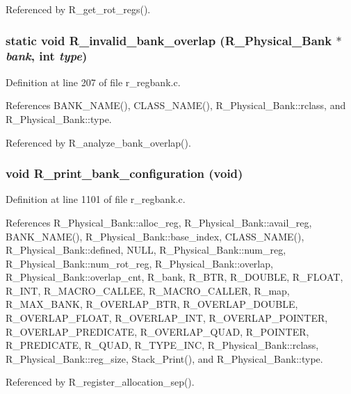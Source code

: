 Referenced by R\_\-get\_\-rot\_\-regs().
\subsubsection{\setlength{\rightskip}{0pt plus 5cm}static void R\_\-invalid\_\-bank\_\-overlap (\bf{R\_\-Physical\_\-Bank} $\ast$ {\em bank}, int {\em type})\hspace{0.3cm}{\tt  [static]}}\label{r__regbank_8c_d3d6af32f7146d72713411dff75451fa}




Definition at line 207 of file r\_\-regbank.c.

References BANK\_\-NAME(), CLASS\_\-NAME(), R\_\-Physical\_\-Bank::rclass, and R\_\-Physical\_\-Bank::type.

Referenced by R\_\-analyze\_\-bank\_\-overlap().
\subsubsection{\setlength{\rightskip}{0pt plus 5cm}void R\_\-print\_\-bank\_\-configuration (void)}\label{r__regbank_8c_9818f92db8b727292ec990c7547adef6}




Definition at line 1101 of file r\_\-regbank.c.

References R\_\-Physical\_\-Bank::alloc\_\-reg, R\_\-Physical\_\-Bank::avail\_\-reg, BANK\_\-NAME(), R\_\-Physical\_\-Bank::base\_\-index, CLASS\_\-NAME(), R\_\-Physical\_\-Bank::defined, NULL, R\_\-Physical\_\-Bank::num\_\-reg, R\_\-Physical\_\-Bank::num\_\-rot\_\-reg, R\_\-Physical\_\-Bank::overlap, R\_\-Physical\_\-Bank::overlap\_\-cnt, R\_\-bank, R\_\-BTR, R\_\-DOUBLE, R\_\-FLOAT, R\_\-INT, R\_\-MACRO\_\-CALLEE, R\_\-MACRO\_\-CALLER, R\_\-map, R\_\-MAX\_\-BANK, R\_\-OVERLAP\_\-BTR, R\_\-OVERLAP\_\-DOUBLE, R\_\-OVERLAP\_\-FLOAT, R\_\-OVERLAP\_\-INT, R\_\-OVERLAP\_\-POINTER, R\_\-OVERLAP\_\-PREDICATE, R\_\-OVERLAP\_\-QUAD, R\_\-POINTER, R\_\-PREDICATE, R\_\-QUAD, R\_\-TYPE\_\-INC, R\_\-Physical\_\-Bank::rclass, R\_\-Physical\_\-Bank::reg\_\-size, Stack\_\-Print(), and R\_\-Physical\_\-Bank::type.

Referenced by R\_\-register\_\-allocation\_\-sep().
